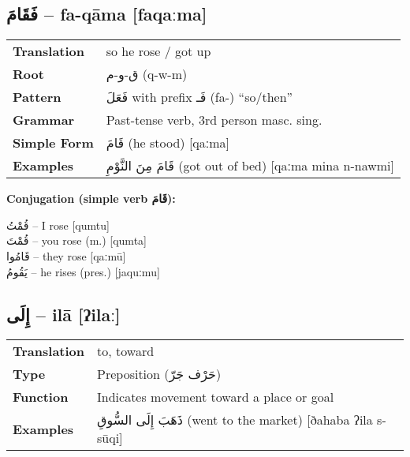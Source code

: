 \documentclass[a4paper,12pt]{article}
\begin{document}
\subsection{\textarabic{فَقَامَ} – \textbf{fa-qāma} [faqaːma]}
\begin{tabular}{p{3cm}p{10cm}}
\toprule
\textbf{Translation} & so he rose / got up\\
\textbf{Root} & \textarabic{ق-و-م} (q-w-m)\\
\textbf{Pattern} & \textarabic{فَعَلَ} with prefix \textarabic{فَـ} (fa-) “so/then”\\
\textbf{Grammar} & Past-tense verb, 3rd person masc. sing.\\
\textbf{Simple Form} & \textarabic{قَامَ} (he stood) [qaːma]\\
\textbf{Examples} & \textarabic{قَامَ مِنَ النَّوْمِ} (got out of bed) [qaːma mina n-nawmi]\\
\bottomrule
\end{tabular}

\textbf{Conjugation (simple verb \textarabic{قَامَ}):}
\begin{multicols}{2}
\small
\textarabic{قُمْتُ} – I rose [qumtu]\\
\textarabic{قُمْتَ} – you rose (m.) [qumta]\\
\textarabic{قَامُوا} – they rose [qaːmū]\\
\textarabic{يَقُومُ} – he rises (pres.) [jaquːmu]\\
\end{multicols}

\subsection{\textarabic{إِلَى} – \textbf{ilā} [ʔilaː]}
\begin{tabular}{p{3cm}p{10cm}}
\toprule
\textbf{Translation} & to, toward\\
\textbf{Type} & Preposition (\textarabic{حَرْف جَرّ})\\
\textbf{Function} & Indicates movement toward a place or goal\\
\textbf{Examples} & \textarabic{ذَهَبَ إِلَى السُّوقِ} (went to the market) [ðahaba ʔila s-sūqi]\\
\bottomrule
\end{tabular}
\end{document}
